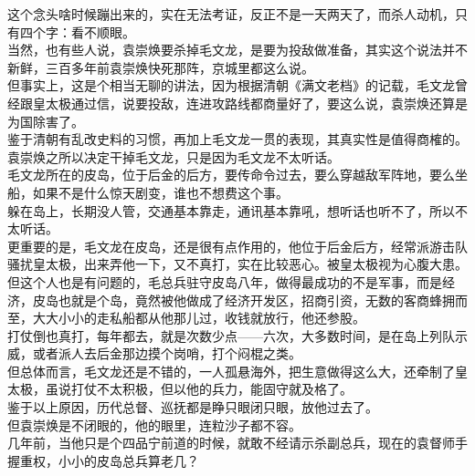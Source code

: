 \begin{multicols}{\theparacolNo}
这个念头啥时候蹦出来的，实在无法考证，反正不是一天两天了，而杀人动机，只有四个字：看不顺眼。\\

当然，也有些人说，袁崇焕要杀掉毛文龙，是要为投敌做准备，其实这个说法并不新鲜，三百多年前袁崇焕快死那阵，京城里都这么说。\\

但事实上，这是个相当无聊的讲法，因为根据清朝《满文老档》的记载，毛文龙曾经跟皇太极通过信，说要投敌，连进攻路线都商量好了，要这么说，袁崇焕还算是为国除害了。\\

鉴于清朝有乱改史料的习惯，再加上毛文龙一贯的表现，其真实性是值得商榷的。\\

袁崇焕之所以决定干掉毛文龙，只是因为毛文龙不太听话。\\

毛文龙所在的皮岛，位于后金的后方，要传命令过去，要么穿越敌军阵地，要么坐船，如果不是什么惊天剧变，谁也不想费这个事。\\

躲在岛上，长期没人管，交通基本靠走，通讯基本靠吼，想听话也听不了，所以不太听话。\\

更重要的是，毛文龙在皮岛，还是很有点作用的，他位于后金后方，经常派游击队骚扰皇太极，出来弄他一下，又不真打，实在比较恶心。被皇太极视为心腹大患。\\

但这个人也是有问题的，毛总兵驻守皮岛八年，做得最成功的不是军事，而是经济，皮岛也就是个岛，竟然被他做成了经济开发区，招商引资，无数的客商蜂拥而至，大大小小的走私船都从他那儿过，收钱就放行，他还参股。\\

打仗倒也真打，每年都去，就是次数少点——六次，大多数时间，是在岛上列队示威，或者派人去后金那边摸个岗哨，打个闷棍之类。\\

但总体而言，毛文龙还是不错的，一人孤悬海外，把生意做得这么大，还牵制了皇太极，虽说打仗不太积极，但以他的兵力，能固守就及格了。\\

鉴于以上原因，历代总督、巡抚都是睁只眼闭只眼，放他过去了。\\

但袁崇焕是不闭眼的，他的眼里，连粒沙子都不容。\\

几年前，当他只是个四品宁前道的时候，就敢不经请示杀副总兵，现在的袁督师手握重权，小小的皮岛总兵算老几？\\


\end{multicols}

